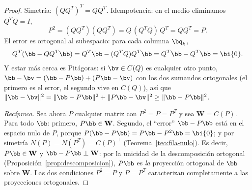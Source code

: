 \begin{proof}
Simetría: $(QQ^T)^T=QQ^T$. Idempotencia: en el medio
eliminamos $Q^T Q=I$,
\[
P^2=(QQ^T)(QQ^T)=Q\,(Q^T Q)\,Q^T=QQ^T=P .
\]
El error es ortogonal al subespacio: para cada columna $\bq_k$,
\[
Q^T(\bb-QQ^T\bb)=Q^T\bb-(Q^T Q)Q^T\bb
=Q^T\bb-Q^T\bb=\bi{0}.
\]
Y estar más cerca es Pitágoras: si $\bv\in C(Q)$ es cualquier otro punto,
$\bb-\bv=(\bb-P\bb)+(P\bb-\bv)$ con los dos sumandos ortogonales
(el primero es el error, el segundo vive en $C(Q)$), así que
$\|\bb-\bv\|^2=\|\bb-P\bb\|^2+\|P\bb-\bv\|^2\ge\|\bb-P\bb\|^2$.

\emph{Recíproca.} Sea ahora $P$ cualquier matriz con $P^2=P=P^T$ y sea
$\mathbf{W}=C(P)$. Para todo $\bb$: primero, $P\bb\in\mathbf{W}$. Segundo,
el ``error'' $\bb-P\bb$ está en el espacio nulo de $P$, porque
$P(\bb-P\bb)=P\bb-P^2\bb=\bi{0}$; y por simetría
$N(P)=N(P^T)=C(P)^{\perp}$ (Teorema~\ref{teo:fila-nulo}). Es decir,
$P\bb\in\mathbf{W}$ y $\bb-P\bb\perp\mathbf{W}$: por la unicidad de la
descomposición ortogonal (Proposición~\ref{prop:descomposicion}), $P\bb$
es \emph{la} proyección ortogonal de $\bb$ sobre $\mathbf{W}$. Las dos
condiciones $P^2=P$ y $P=P^T$ caracterizan completamente a las
proyecciones ortogonales.
\end{proof}

